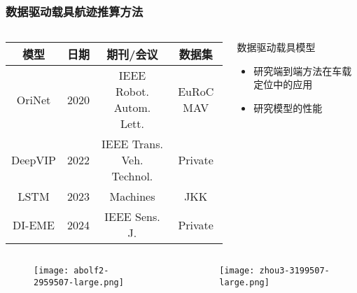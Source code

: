 \begin{frame}
	\frametitle{数据驱动载具航迹推算方法}
	\begin{columns}[t]
		\begin{column}{0.5\textwidth}
		{
		    \tiny
		    \setlength{\tabcolsep}{2pt}
			\begin{tabular*}{\linewidth}{@{\extracolsep{\fill}}cccc}
				\toprule
				\multicolumn{1}{c}{模型} & 日期 & 期刊/会议 & 数据集 \\
				\midrule
				OriNet  & 2020 & IEEE Robot. Autom. Lett.  & EuRoC MAV \\
				DeepVIP & 2022 & IEEE Trans. Veh. Technol. & Private   \\ %
				LSTM    & 2023 & Machines                  & JKK       \\
				DI-EME  & 2024 & IEEE Sens. J.             & Private   \\
				\bottomrule
			\end{tabular*}         
		}
		\end{column}   
		\begin{column}{0.5\textwidth}
			\begin{block}{数据驱动载具模型}
			    {
			        \footnotesize
					\begin{itemize}
						\item 研究端到端方法在车载定位中的应用
						\item 研究模型的性能
					\end{itemize}			    
			    }
			\end{block}
		\end{column}
	\end{columns}
	\vspace{-0.2cm}
	\begin{columns}[b]
		\begin{column}{0.5\textwidth}
		   	\begin{figure}
				\texttt{[image: abolf2-2959507-large.png]}
		   	\end{figure}
		\end{column}
		\begin{column}{0.5\textwidth}
		    \vspace{-0.5cm}
		   	\begin{figure}
				\texttt{[image: zhou3-3199507-large.png]}
		   	\end{figure}
		\end{column}
	\end{columns}
\end{frame}

